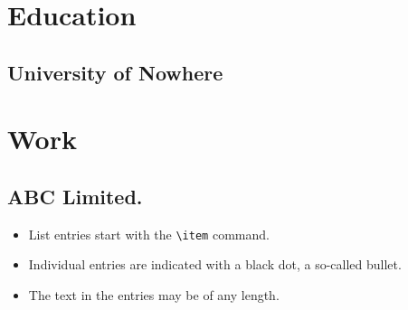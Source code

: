 \documentclass{my_cv}
\begin{document}
\section{Education}
\subsection{University of Nowhere}
\section{Work}
\subsection{ABC Limited.}

\begin{itemize}
  \item List entries start with the \verb|\item| command.
  \item Individual entries are indicated with a black dot, a so-called bullet.
  \item The text in the entries may be of any length.
\end{itemize}
\end{document}
